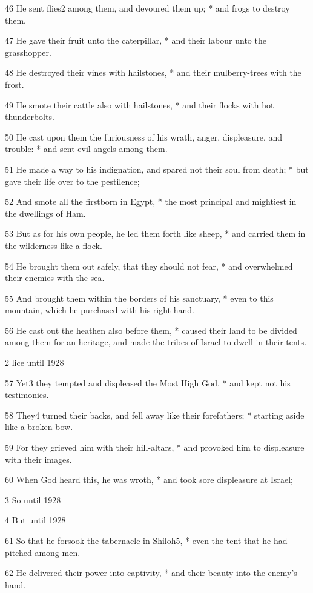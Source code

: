 46 He sent flies2 among them, and devoured them up; * and frogs
to destroy them.

47 He gave their fruit unto the caterpillar, * and their
labour unto the grasshopper.

48 He destroyed their vines with hailstones, * and their
mulberry-trees with the frost.

49 He smote their cattle also with hailstones, * and
their flocks with hot thunderbolts.

50 He cast upon them the furiousness of his wrath, anger,
displeasure, and trouble: * and sent evil angels among them.

51 He made a way to his indignation, and spared not their
soul from death; * but gave their life over to the pestilence;

52 And smote all the firstborn in Egypt, * the most principal
and mightiest in the dwellings of Ham.

53 But as for his own people, he led them forth like
sheep, * and carried them in the wilderness like a flock.

54 He brought them out safely, that they should not fear,
* and overwhelmed their enemies with the sea.

55 And brought them within the borders of his sanctuary,
* even to this mountain, which he purchased with his right hand.

56 He cast out the heathen also before them, * caused
their land to be divided among them for an heritage, and made the tribes
of Israel to dwell in their tents.

2 lice
until 1928

57 Yet3 they tempted and displeased the Most High God, * and
kept not his testimonies.

58 They4 turned their backs, and fell away
like their forefathers; * starting aside like a broken bow.

59 For they grieved him with their hill-altars, * and
provoked him to displeasure with their images.

60 When God heard this, he was wroth, * and took sore
displeasure at Israel;

3 So
until 1928

4 But
until 1928

61 So that he forsook the tabernacle in Shiloh5, * even the tent
that he had pitched among men.

62 He delivered their power into captivity, * and their
beauty into the enemy's hand.

